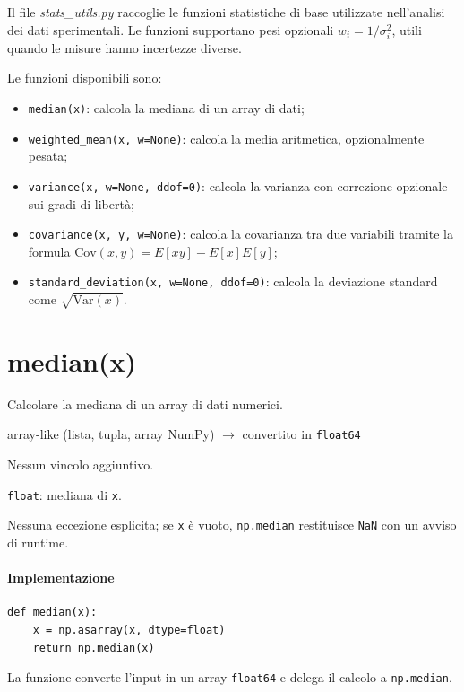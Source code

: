 Il file \textit{stats\_utils.py} raccoglie le funzioni statistiche di base utilizzate nell'analisi dei dati sperimentali. Le funzioni supportano pesi opzionali $w_i = 1/\sigma_i^2$, utili quando le misure hanno incertezze diverse.

Le funzioni disponibili sono:
\begin{itemize}
    \item \texttt{median(x)}: calcola la mediana di un array di dati;
    \item \texttt{weighted\_mean(x, w=None)}: calcola la media aritmetica, opzionalmente pesata;
    \item \texttt{variance(x, w=None, ddof=0)}: calcola la varianza con correzione opzionale sui gradi di libertà;
    \item \texttt{covariance(x, y, w=None)}: calcola la covarianza tra due variabili tramite la formula $\text{Cov}(x,y) = E[xy] - E[x]E[y]$;
    \item \texttt{standard\_deviation(x, w=None, ddof=0)}: calcola la deviazione standard come $\sqrt{\text{Var}(x)}$.
\end{itemize}

\section{median(x)}
\label{sec:median}
\begin{apidesc}
  \item[\textbf{Scopo}]
    Calcolare la mediana di un array di dati numerici.
  \item[\textbf{Parametri}]\hfill
    \begin{description}[font=\normalfont\ttfamily\bfseries, labelwidth=1.5em, leftmargin=2em, itemsep=1pt, parsep=0pt, topsep=1pt]
      \item[x] array-like (lista, tupla, array NumPy) $\to$ convertito in \texttt{float64}
    \end{description}
  \item[\textbf{Vincoli}]
    Nessun vincolo aggiuntivo.
  \item[\textbf{Restituisce}]
    \texttt{float}: mediana di \texttt{x}.
  \item[\textbf{Eccezioni}]
    Nessuna eccezione esplicita; se \texttt{x} è vuoto, \texttt{np.median} restituisce
    \texttt{NaN} con un avviso di runtime.
\end{apidesc}

\paragraph{Implementazione}
\begin{verbatim}
def median(x):
    x = np.asarray(x, dtype=float)
    return np.median(x)
\end{verbatim}
La funzione converte l'input in un array \texttt{float64} e delega il calcolo a \texttt{np.median}.

